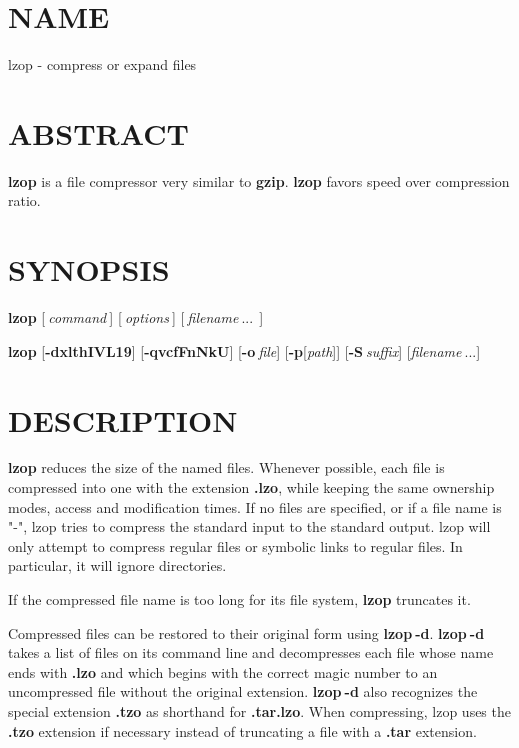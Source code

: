 \section{NAME\label{NAME}}


lzop - compress or expand files

\section{ABSTRACT\label{ABSTRACT}}


\textbf{lzop} is a file compressor very similar to \textbf{gzip}.
\textbf{lzop} favors speed over compression ratio.

\section{SYNOPSIS\label{SYNOPSIS}}


\textbf{lzop} [$\:$\textit{command}$\:$] [$\:$\textit{options}$\:$] [$\:$\textit{filename}$\:$...$\:$$\:$]



\textbf{lzop} [\textbf{-dxlthIVL19}] [\textbf{-qvcfFnNkU}]
[\textbf{-o}$\:$\textit{file}] [\textbf{-p}[\textit{path}]] [\textbf{-S}$\:$\textit{suffix}]
[\textit{filename}$\:$...]

\section{DESCRIPTION\label{DESCRIPTION}}


\textbf{lzop} reduces the size of the named files. Whenever possible,
each file is compressed into one with the extension
\textbf{.lzo}, while keeping the same ownership modes, access and
modification times. If no files are specified, or if a
file name is "-", lzop tries to compress the standard
input to the standard output. lzop will only attempt to
compress regular files or symbolic links to regular files.
In particular, it will ignore directories.



If the compressed file name is too long for its file system,
\textbf{lzop} truncates it.



Compressed files can be restored to their original form
using \textbf{lzop$\:$-d}.
\textbf{lzop$\:$-d} takes a list of files on its command line and
decompresses each file whose name ends with \textbf{.lzo} and which
begins with the correct magic number to an uncompressed
file without the original extension. \textbf{lzop$\:$-d} also recognizes
the special extension \textbf{.tzo} as shorthand for \textbf{.tar.lzo}.
When compressing, lzop uses the \textbf{.tzo} extension if necessary
instead of truncating a file with a \textbf{.tar} extension.



